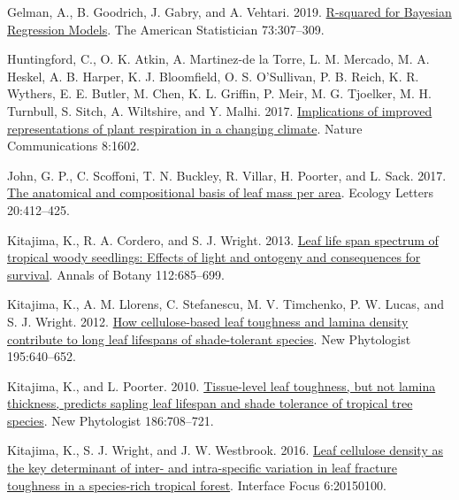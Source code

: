 \documentclass[
  12pt,
  a4paper,
,tablecaptionabove
]{scrartcl}
\newlength{\cslhangindent}
\newenvironment{CSLReferences}[2] %
 {%
  \setlength{\parindent}{0pt}
  \ifodd #1 \everypar{\setlength{\hangindent}{\cslhangindent}}\ignorespaces\fi
  \ifnum #2 > 0
  \setlength{\parskip}{#2\baselineskip}
  \fi
 }%
 {}
\begin{document}
\begin{CSLReferences}{1}{0}
\leavevmode{}%
Gelman, A., B. Goodrich, J. Gabry, and A. Vehtari. 2019. \href{https://doi.org/10.1080/00031305.2018.1549100}{R-squared for {Bayesian Regression Models}}. The American Statistician 73:307--309.

\leavevmode{}%
Huntingford, C., O. K. Atkin, A. Martinez-de la Torre, L. M. Mercado, M. A. Heskel, A. B. Harper, K. J. Bloomfield, O. S. O'Sullivan, P. B. Reich, K. R. Wythers, E. E. Butler, M. Chen, K. L. Griffin, P. Meir, M. G. Tjoelker, M. H. Turnbull, S. Sitch, A. Wiltshire, and Y. Malhi. 2017. \href{https://doi.org/10.1038/s41467-017-01774-z}{Implications of improved representations of plant respiration in a changing climate}. Nature Communications 8:1602.

\leavevmode{}%
John, G. P., C. Scoffoni, T. N. Buckley, R. Villar, H. Poorter, and L. Sack. 2017. \href{https://doi.org/10.1111/ele.12739}{The anatomical and compositional basis of leaf mass per area}. Ecology Letters 20:412--425.

\leavevmode{}%
Kitajima, K., R. A. Cordero, and S. J. Wright. 2013. \href{https://doi.org/10.1093/aob/mct036}{Leaf life span spectrum of tropical woody seedlings: {Effects} of light and ontogeny and consequences for survival}. Annals of Botany 112:685--699.

\leavevmode{}%
Kitajima, K., A. M. Llorens, C. Stefanescu, M. V. Timchenko, P. W. Lucas, and S. J. Wright. 2012. \href{https://doi.org/10.1111/j.1469-8137.2012.04203.x}{How cellulose-based leaf toughness and lamina density contribute to long leaf lifespans of shade-tolerant species}. New Phytologist 195:640--652.

\leavevmode{}%
Kitajima, K., and L. Poorter. 2010. \href{https://doi.org/10.1111/j.1469-8137.2010.03212.x}{Tissue-level leaf toughness, but not lamina thickness, predicts sapling leaf lifespan and shade tolerance of tropical tree species}. New Phytologist 186:708--721.

\leavevmode{}%
Kitajima, K., S. J. Wright, and J. W. Westbrook. 2016. \href{https://doi.org/10.1098/rsfs.2015.0100}{Leaf cellulose density as the key determinant of inter- and intra-specific variation in leaf fracture toughness in a species-rich tropical forest}. Interface Focus 6:20150100.


\end{CSLReferences}
\end{document}
